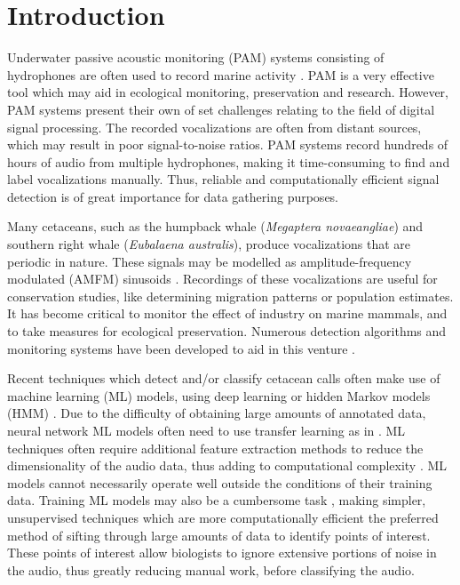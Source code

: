\section{Introduction}

Underwater passive acoustic monitoring (PAM) systems consisting of hydrophones are often 
used to record marine activity \citep{hydrophone, internalsignaldetection, dolphindetection}. 
PAM is a very effective tool which may aid in ecological monitoring, preservation and
research. However, PAM systems present their own of set challenges relating 
to the field of digital signal processing. The recorded vocalizations are often 
from distant sources, which may result in poor signal-to-noise ratios. 
PAM systems record hundreds of hours of audio from multiple hydrophones, 
making it time-consuming to find and label vocalizations manually. Thus, 
reliable and computationally efficient signal detection is of great 
importance for data gathering purposes.

Many cetaceans, such as the humpback whale (\textit{Megaptera novaeangliae}) and southern right whale (\textit{Eubalaena australis}), produce vocalizations that are periodic in nature. These signals may be modelled as amplitude-frequency modulated (AMFM) sinusoids \citep{whalemodel}. Recordings of these vocalizations are useful for conservation studies, like determining migration patterns or population estimates. It has become critical to monitor the effect of industry on marine mammals, and to take measures for ecological preservation. Numerous detection algorithms and monitoring systems have been developed to aid in this venture \citep{glider, rightdetection}.

Recent techniques which detect and/or classify cetacean calls often make use of machine learning (ML) models, 
using deep learning \citep{MLcnn, MLalexnet} or hidden Markov models (HMM) \citep{hmm1, hmm2}. 
Due to the difficulty of obtaining large amounts of annotated data, neural network ML models often 
need to use transfer learning as in \citep{MLalexnet}. ML techniques often require additional feature 
extraction methods to reduce the dimensionality of the audio data, thus adding to computational 
complexity \citep{hmm3}. ML models cannot necessarily operate well outside the conditions of their training data. 
Training ML models may also be a cumbersome task \citep{unsupervised}, making simpler, unsupervised techniques 
which are more computationally efficient the preferred method of sifting through large amounts of data to 
identify points of interest. These points of interest allow biologists to ignore extensive portions of noise in the 
audio, thus greatly reducing manual work, before classifying the audio.

